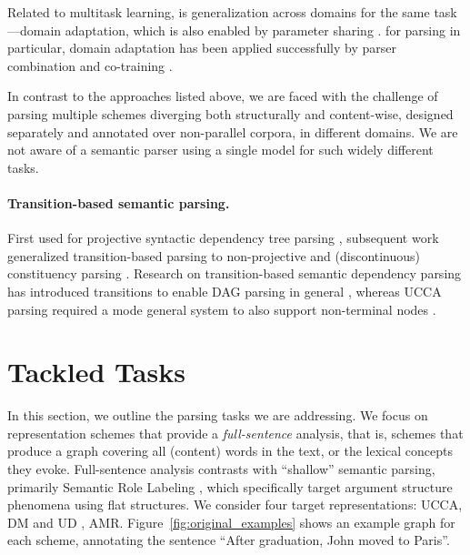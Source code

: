 \documentclass[11pt,a4paper]{article}
\begin{document}
Related to multitask learning, is generalization across domains for the same task---domain
adaptation, which is also enabled by parameter sharing \cite{W06-1615,P07-1033,K17-1040}.
for parsing in particular, domain adaptation has been applied successfully by
parser combination and co-training \cite{mcclosky2010automatic,baucom2013domain}.

In contrast to the approaches listed above, we are faced with the challenge
of parsing multiple schemes diverging both structurally and content-wise,
designed separately and annotated over non-parallel corpora, in different domains.
We are not aware of a semantic parser using a single model for
such widely different tasks.

\paragraph{Transition-based semantic parsing.}

First used for projective syntactic dependency tree parsing
\cite{nivre2008algorithms},
subsequent work generalized transition-based parsing to non-projective and (discontinuous) constituency
parsing \cite{nivre2009non,zhang2009transition,maier-lichte:2016:DiscoNLP}.
Research on transition-based semantic dependency parsing
has introduced transitions to enable DAG parsing in general
\cite{sagae2008shift,ribeyre-villemontedelaclergerie-seddah:2014:SemEval,du-EtAl:2015:SemEval},
whereas UCCA parsing required a mode general system to also support non-terminal nodes
\cite{hershcovich2017a}.



\section{Tackled Tasks}\label{sec:tasks}

In this section, we outline the parsing tasks we are addressing.
We focus on representation schemes that provide a \textit{full-sentence} analysis,
that is, schemes that produce a graph covering all (content) words in the text, or the
lexical concepts they evoke.
Full-sentence analysis contrasts with ``shallow'' semantic parsing,
primarily Semantic Role Labeling
\cite[SRL;][]{Palmer:05,gildea2002automatic,swayamdipta2017frame,ringgaard2017sling},
which specifically target argument structure phenomena using flat structures.
We consider four target representations: UCCA, DM and UD
\cite[Universal Dependencies; ][]{nivre2016universal}, AMR.
Figure~\ref{fig:original_examples} shows an example graph for each scheme,
annotating the sentence ``After graduation, John moved to Paris''.
\end{document}
